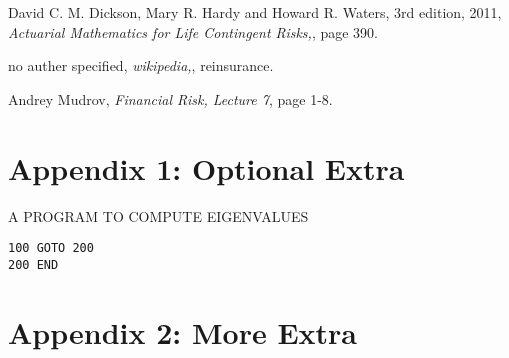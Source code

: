 \documentclass{report}
\begin{document}
{\begin{thebibliography}{99}
  David C. M. Dickson, Mary R. Hardy and Howard R. Waters,
    3rd edition, 2011, 
    {\em Actuarial Mathematics for Life Contingent Risks,},
    page 390.

  no auther specified,
    {\em wikipedia,},
    reinsurance.

  Andrey Mudrov,
    {\em Financial Risk, Lecture 7},
    page 1-8.











\end{thebibliography}


\chapter*{Appendix 1: Optional Extra}

\begin{center}
   {\Large A PROGRAM TO COMPUTE EIGENVALUES}
\end{center}

\begin{verbatim}    
100 GOTO 200
200 END
\end{verbatim}    

\chapter*{Appendix 2: More Extra}


%
%
\newcommand{\X}[1]{$#1$&\texttt{\string#1}\hspace*{1ex}}
\newsavebox{\symbbox}
\newenvironment{symbols}[1]%
{\par\vspace*{2ex}
\begin{lrbox}{\symbbox}
\hspace*{4ex}\begin{tabular}{@{}#1@{}}}%
{\end{tabular}\end{lrbox}\makebox[\textwidth]{\usebox{\symbbox}}\par\medskip}



}
\end{document}
